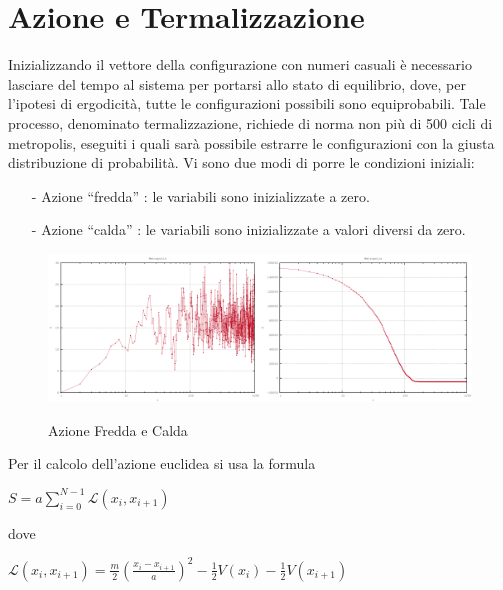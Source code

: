 \documentclass[a4paper,11pt]{report}
\begin{document}
\section{Azione e Termalizzazione}

Inizializzando il vettore della configurazione con numeri casuali è necessario lasciare del tempo al sistema per portarsi allo stato di equilibrio, dove, per l'ipotesi di ergodicità, tutte le configurazioni possibili sono equiprobabili. Tale processo, denominato termalizzazione, richiede di norma non più di 500 cicli di metropolis, eseguiti i quali sarà possibile estrarre le configurazioni con la giusta distribuzione di probabilità. Vi sono due modi di porre le condizioni iniziali:
\begin{itemize}
   \small
   \item[-] Azione ``fredda'' : le variabili sono inizializzate a zero.
   \item[-] Azione ``calda'' : le variabili sono inizializzate a valori diversi da zero.
\end{itemize}
\begin{figure}[h]
\centering
\includegraphics[width=0.5\textwidth]{action1}\includegraphics[width=0.5\textwidth]{action2}
\caption{Azione Fredda e Calda}
\label{fig:action}
\end{figure}
Per il calcolo dell'azione euclidea si usa la formula
\begin{center}$S = a\displaystyle\sum\limits_{i=0}^{N-1} \mathcal{L}(x_{i},x_{i+1})$\end{center}
dove
\begin{center}$\mathcal{L}(x_{i},x_{i+1}) = \frac{m}{2}\left(\frac{x_{i}-x_{i+1}}{a}\right)^{2}-\frac{1}{2}V(x_{i})-\frac{1}{2}V(x_{i+1})$\end{center}
\end{document}
